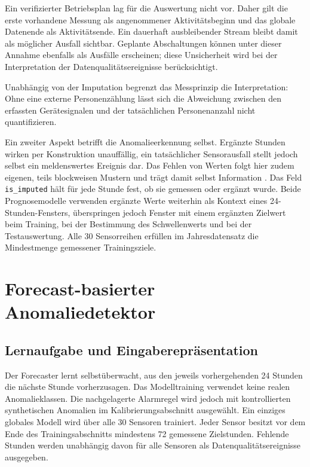 Ein verifizierter Betriebsplan lag für die Auswertung nicht vor. Daher gilt
die erste vorhandene Messung als angenommener Aktivitätsbeginn und das globale
Datenende als Aktivitätsende. Ein dauerhaft ausbleibender Stream bleibt damit
als möglicher Ausfall sichtbar. Geplante Abschaltungen können unter dieser
Annahme ebenfalls als Ausfälle erscheinen; diese Unsicherheit wird bei der
Interpretation der Datenqualitätsereignisse berücksichtigt.

Unabhängig von der Imputation begrenzt das Messprinzip die Interpretation:
Ohne eine externe Personenzählung lässt sich die Abweichung zwischen den
erfassten Gerätesignalen und der tatsächlichen Personenanzahl nicht
quantifizieren.

Ein zweiter Aspekt betrifft die Anomalieerkennung selbst. Ergänzte Stunden
wirken per Konstruktion unauffällig, ein tatsächlicher Sensorausfall stellt
jedoch selbst ein meldenswertes Ereignis dar. Das Fehlen von Werten folgt
hier zudem eigenen, teils blockweisen Mustern und trägt damit selbst
Information \cite{zhang_survey_2024}. Das Feld \texttt{is\_imputed} hält für
jede Stunde fest, ob sie gemessen oder ergänzt wurde. Beide Prognosemodelle
verwenden ergänzte Werte weiterhin als Kontext eines 24-Stunden-Fensters,
überspringen jedoch Fenster mit einem ergänzten Zielwert beim Training, bei der
Bestimmung des Schwellenwerts und bei der Testauswertung. Alle 30 Sensorreihen
erfüllen im Jahresdatensatz die Mindestmenge gemessener Trainingsziele.

\section[Forecaster]{Forecast-basierter Anomaliedetektor}
\label{sec:Methode_Forecaster}

\subsection{Lernaufgabe und Eingaberepräsentation}

Der Forecaster lernt selbstüberwacht, aus den jeweils vorhergehenden 24 Stunden
die nächste Stunde vorherzusagen. Das Modelltraining verwendet keine realen
Anomalieklassen. Die nachgelagerte Alarmregel wird jedoch mit kontrollierten
synthetischen Anomalien im Kalibrierungsabschnitt ausgewählt. Ein einziges
globales Modell wird über alle 30
Sensoren trainiert. Jeder Sensor besitzt vor dem Ende des Trainingsabschnitts
mindestens 72 gemessene Zielstunden. Fehlende Stunden werden unabhängig davon
für alle Sensoren als Datenqualitätsereignisse ausgegeben.

